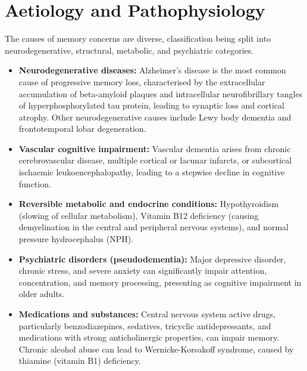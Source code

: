 \section*{Aetiology and Pathophysiology}
The causes of memory concerns are diverse, classification being split into neurodegenerative, structural, metabolic, and psychiatric categories.
\begin{itemize}
    \item \textbf{Neurodegenerative diseases:} Alzheimer's disease is the most common cause of progressive memory loss, characterised by the extracellular accumulation of beta-amyloid plaques and intracellular neurofibrillary tangles of hyperphosphorylated tau protein, leading to synaptic loss and cortical atrophy. Other neurodegenerative causes include Lewy body dementia and frontotemporal lobar degeneration.
    \item \textbf{Vascular cognitive impairment:} Vascular dementia arises from chronic cerebrovascular disease, multiple cortical or lacunar infarcts, or subcortical ischaemic leukoencephalopathy, leading to a stepwise decline in cognitive function.
    \item \textbf{Reversible metabolic and endocrine conditions:} Hypothyroidism (slowing of cellular metabolism), Vitamin B12 deficiency (causing demyelination in the central and peripheral nervous systems), and normal pressure hydrocephalus (NPH).
    \item \textbf{Psychiatric disorders (pseudodementia):} Major depressive disorder, chronic stress, and severe anxiety can significantly impair attention, concentration, and memory processing, presenting as cognitive impairment in older adults.
    \item \textbf{Medications and substances:} Central nervous system active drugs, particularly benzodiazepines, sedatives, tricyclic antidepressants, and medications with strong anticholinergic properties, can impair memory. Chronic alcohol abuse can lead to Wernicke-Korsakoff syndrome, caused by thiamine (vitamin B1) deficiency.
\end{itemize}

